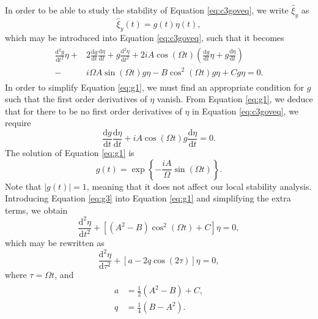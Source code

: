 \documentclass[12pt]{ociamthesis}
\begin{document}
%
In order to be able to study the stability of Equation \eqref{eq:c3goveq}, we write $\hat \xi_y$ as
%
\begin{equation}
\label{eq:g0}
\hat \xi_y (t) = g(t) \eta(t),
\end{equation}
%
which may be introduced into Equation \eqref{eq:c3goveq}, such that it becomes
%
\begin{align}
\begin{split}
\label{eq:g1}
\frac{\mathrm{d}^2 g}{\mathrm{d} t^2} \eta
+ & 2 \frac{\mathrm{d} g}{\mathrm{d} t} \frac{\mathrm{d} \eta}{\mathrm{d} t}
+ g \frac{\mathrm{d}^2 \eta}{\mathrm{d} t^2}
+ 2 i A \cos(\Omega t) ( \frac{\mathrm{d} g}{\mathrm{d} t} \eta
+ g \frac{\mathrm{d} \eta}{\mathrm{d} t})
\\[0.1cm]
- & i \Omega A \sin(\Omega t) g \eta 
- B \cos^2(\Omega t) g \eta
+ C g \eta
= 0.
\end{split}
\end{align}
%
In order to simplify Equation \eqref{eq:g1}, we must find an appropriate condition for $g$ such that the first order derivatives of $\eta$ vanish.
From Equation \eqref{eq:g1}, we deduce that for there to be no first order derivatives of $\eta$ in Equation \eqref{eq:c3goveq}, we require
%
\begin{equation}
\label{eq:g2}
\frac{\mathrm{d} g}{\mathrm{d} t} \frac{\mathrm{d} \eta}{\mathrm{d} t}
+ i A \cos(\Omega t) g \frac{\mathrm{d} \eta}{\mathrm{d} t}
= 0.
\end{equation}
%
The solution of Equation \eqref{eq:g1} is
%
\begin{equation}
\label{eq:g3}
g(t) = \exp\left\{- \frac{i A}{\Omega} \sin(\Omega t)\right\}.
\end{equation}
Note that $|g(t)| = 1$, meaning that it does not affect our local stability analysis.
%
Introducing Equation \eqref{eq:g3} into Equation \eqref{eq:g1} and simplifying the extra terms, we obtain
\begin{equation}
\frac{\mathrm{d}^2 \eta}{\mathrm{d} t^2} + [(A^2 - B)\cos^2(\Omega t) + C] \eta = 0,
\end{equation}
%
which may be rewritten as
%
\begin{equation}
\label{eq:mathieu}
\frac{\mathrm{d}^2 \eta}{\mathrm{d} \tau^2}
+ [a - 2 q \cos(2 \tau)] \eta = 0,
\end{equation}
%
where $\tau = \Omega t$, and
\begin{align}
\begin{split}
\label{eq:aq0}
a & = \frac{1}{2} (A^2 - B) + C,
\\[0.1cm]
q & = \frac{1}{4} (B - A^2).
\end{split}
\end{align}
%
\end{document}
